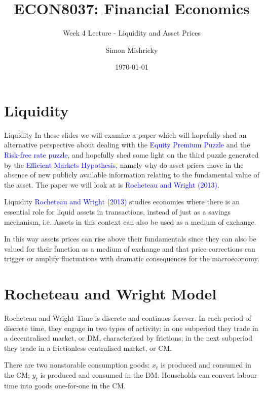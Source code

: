 \documentclass[aspectratio=169,xcolor=dvipsnames]{beamer}
\title{ECON8037: Financial Economics}
\subtitle{\normalsize Week 4 Lecture - Liquidity and Asset Prices}
\author{Simon Mishricky}
\institute{Research School of Economics, Australian National University}
\date{\today}
\begin{document}
\section{Liquidity}
\frame{\titlepage}

\begin{frame}{Liquidity}
    In these slides we will examine a paper which will hopefully shed an alternative perspective about dealing with the \textcolor{blue}{Equity Premium Puzzle} and the \textcolor{blue}{Risk-free rate puzzle}, and hopefully shed some light on the third puzzle generated by the \textcolor{blue}{Efficient Markets Hypothesis}, namely why do asset prices move in the absence of new publicly available information relating to the fundamental value of the asset. The paper we will look at is \textcolor{blue}{Rocheteau and Wright (2013)}.
\end{frame}

\begin{frame}{Liquidity}
    \textcolor{blue}{Rocheteau and Wright (2013)} studies economies where there is an essential role for liquid assets in transactions, instead of just as a savings mechanism, i.e. Assets in this context can also be used as a medium of exchange.

    In this way assets prices can rise above their fundamentals since they can also be valued for their function as a medium of exchange and that price corrections can trigger or amplify fluctuations with dramatic consequences for the macroeconomy.
\end{frame}

\section{Rocheteau and Wright Model}

\begin{frame}{Rocheteau and Wright}
    Time is discrete and continues forever. In each period of discrete time, they engage in two types of activity: in one subperiod they trade in a decentralised market, or DM, characterised by frictions; in the next subperiod they trade in a frictionless centralised market, or CM.

    \vspace{3mm}
    \begin{center}
    \end{center}
    \vspace{3mm}
    There are two nonstorable consumption goods: $x_t$ is produced and consumed in the CM; $y_t$ is produced and consumed in the DM. Households can convert labour time into goods one-for-one in the CM.
\end{frame}
\end{document}
